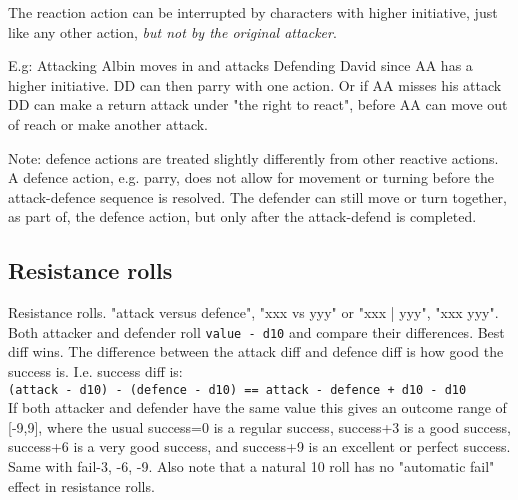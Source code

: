 The reaction action can be interrupted by characters with higher initiative, just like any other action, \emph{but not by the original attacker}.

E.g: Attacking Albin moves in and attacks Defending David since AA has a higher initiative. DD can then parry with one action. Or if AA misses his attack DD can make a return attack under "the right to react", before AA can move out of reach or make another attack.

Note: defence actions are treated slightly differently from other reactive actions. A defence action, e.g. parry, does not allow for movement or turning before the attack-defence sequence is resolved. The defender can still move or turn together, as part of, the defence action, but only after the attack-defend is completed. %


\subsection*{Resistance rolls}
Resistance rolls. "attack versus defence",  "xxx vs yyy" or "xxx | yyy", "xxx \vs yyy".\\
Both attacker and defender roll \verb|value - d10| and compare their differences. Best diff wins. The difference between the attack diff and defence diff is how good the success is. I.e. success diff is:\\
\verb|(attack - d10) - (defence - d10) == attack - defence + d10 - d10|\\ If both attacker and defender have the same value this gives an outcome range of [-9,9], where the usual success=0 is a regular success, success+3 is a good success, success+6 is a very good success, and success+9 is an excellent or perfect success. Same with fail-3, -6, -9. Also note that a natural 10 roll has no "automatic fail" effect in resistance rolls.

